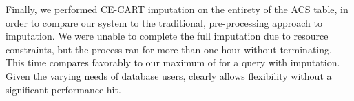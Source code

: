 Finally, we performed CE-CART imputation on the entirety of the ACS table, in order to compare our system to the traditional, pre-processing approach to imputation.
We were unable to complete the full imputation due to resource constraints, but the process ran for more than one hour without terminating.
This time compares favorably to our maximum of  for a query with imputation.
Given the varying needs of database users, \ProjectName{} clearly allows flexibility without a significant performance hit.


